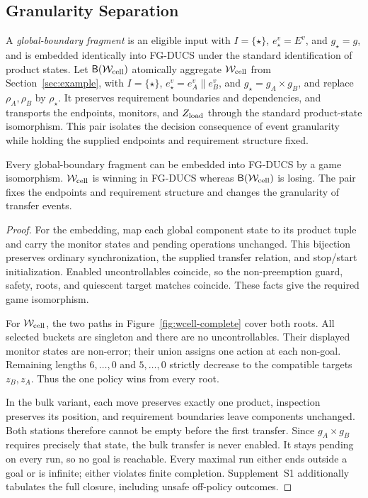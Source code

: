 \documentclass[acmsmall,screen,review,anonymous]{acmart}
\begin{document}
\subsection{Granularity Separation}
\label{sec:mechanism-boundary}

A \emph{global-boundary fragment} is an eligible input with
$I=\{\star\}$, $e_\star^v=E^v$, and $g_\star=g$, and is embedded identically into FG-DUCS under the standard identification of product states.
Let $\mathsf B(\mathcal W_{\rm cell})$ atomically aggregate $\mathcal W_{\rm cell}$ from Section~\ref{sec:example}, with
$I=\{\star\}$, $e_\star^v=e_A^v\parallel e_B^v$, and $g_\star=g_A\times g_B$, and replace $\rho_A,\rho_B$ by $\rho_\star$.
It preserves requirement boundaries and dependencies, and transports the endpoints, monitors, and $Z_{\rm load}$ through the standard product-state isomorphism. This pair isolates the decision consequence of event granularity while holding the supplied endpoints and requirement structure fixed.

\begin{theorem}
\label{prop:branching}
Every global-boundary fragment can be embedded into FG-DUCS by a game isomorphism. $\mathcal W_{\rm cell}$ is winning in FG-DUCS whereas $\mathsf B(\mathcal W_{\rm cell})$ is losing. The pair fixes the endpoints and requirement structure and changes the granularity of transfer events.
\end{theorem}

\begin{proof}
For the embedding, map each global component state to its product tuple and carry the monitor states and pending operations unchanged. This bijection preserves ordinary synchronization, the supplied transfer relation, and stop/start initialization. Enabled uncontrollables coincide, so the non-preemption guard, safety, roots, and quiescent target matches coincide. These facts give the required game isomorphism.

For $\mathcal W_{\rm cell}$, the two paths in Figure~\ref{fig:wcell-complete} cover both roots. All selected buckets are singleton and there are no uncontrollables. Their displayed monitor states are non-error; their union assigns one action at each non-goal. Remaining lengths $6,\ldots,0$ and $5,\ldots,0$ strictly decrease to the compatible targets $z_B,z_A$. Thus the one policy wins from every root.

In the bulk variant, each move preserves exactly one product, inspection preserves its position, and requirement boundaries leave components unchanged. Both stations therefore cannot be empty before the first transfer. Since $g_A\times g_B$ requires precisely that state, the bulk transfer is never enabled. It stays pending on every run, so no goal is reachable. Every maximal run either ends outside a goal or is infinite; either violates finite completion. Supplement~S1 additionally tabulates the full closure, including unsafe off-policy outcomes.
\end{proof}
\end{document}
